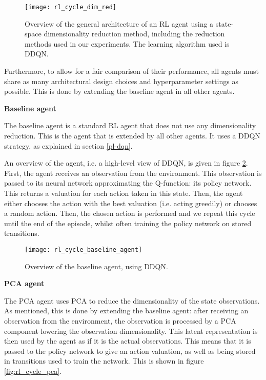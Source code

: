 \begin{figure}[h]
    \centering
    \texttt{[image: rl\_cycle\_dim\_red]}
    \caption{Overview of the general architecture of an RL agent using a state-space dimensionality reduction method, including the reduction methods used in our experiments. The learning algorithm used is DDQN.}
    \label{fig:rl_cycle_dim}
\end{figure}

Furthermore, to allow for a fair comparison of their performance, all agents must share as many architectural design choices and hyperparameter settings as possible. This is done by extending the baseline agent in all other agents. \par

\noindent \textbf{Baseline agent} \par
\noindent The baseline agent is a standard RL agent that does not use any dimensionality reduction. This is the agent that is extended by all other agents. It uses a DDQN strategy, as explained in section \ref{pl-dqn}. 

An overview of the agent, i.e. a high-level view of DDQN, is given in figure \ref{fig:rl_cycle_base}. First, the agent receives an observation from the environment. This observation is passed to its neural network approximating the Q-function: its policy network. This returns a valuation for each action taken in this state. Then, the agent either chooses the action with the best valuation (i.e. acting greedily) or chooses a random action. Then, the chosen action is performed and we repeat this cycle until the end of the episode, whilst often training the policy network on stored transitions. \par

\begin{figure}[h]
    \centering
    \texttt{[image: rl\_cycle\_baseline\_agent]}
    \caption{Overview of the baseline agent, using DDQN.}
    \label{fig:rl_cycle_base}
\end{figure}

\noindent \textbf{PCA agent}\par
\noindent The PCA agent uses PCA to reduce the dimensionality of the state observations. As mentioned, this is done by extending the baseline agent: after receiving an observation from the environment, the observation is processed by a PCA component lowering the observation dimensionality. This latent representation is then used by the agent as if it is the actual observations. This means that it is passed to the policy network to give an action valuation, as well as being stored in transitions used to train the network. This is shown in figure \ref{fig:rl_cycle_pca}.


